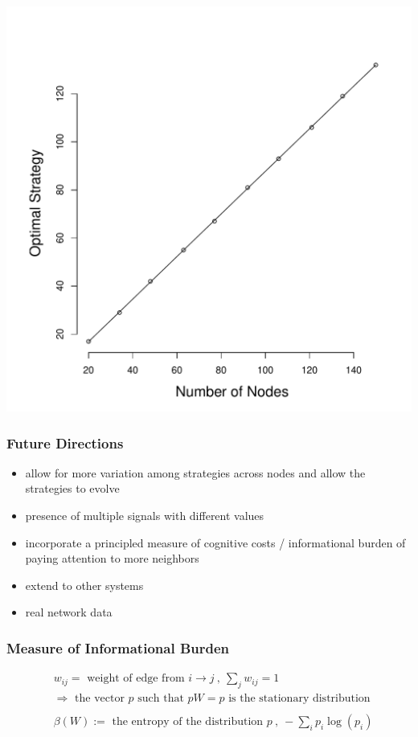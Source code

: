 \documentclass{beamer}
\begin{document}
\begin{frame}
\begin{center}
\includegraphics[width=.75\textwidth]{ESS_strategy.pdf}
\end{center}
\end{frame}

\begin{frame}
 \frametitle{Future Directions}
 \begin{itemize}
 \item allow for more variation among strategies across nodes and allow the strategies to evolve
 \item presence of multiple signals with different values 
 \item incorporate a principled measure of cognitive costs / informational burden of paying attention to more neighbors
 \item extend to other systems
 \item real network data
 \end{itemize}
 \end{frame}

\begin{frame}
\frametitle{Measure of Informational Burden}
\begin{align*}
&w_{ij}= \text{ weight of edge from } i\to j \ , \ \sum_jw_{ij}=1
\\& \Longrightarrow \text{ the vector $p$  such that } pW=p \text{ is the stationary distribution} 
 \\\\&\beta(W):= \text{ the entropy of the distribution }p \ , \ -\sum_ip_i\log(p_i)
\end{align*}

\end{frame}
\end{document}
